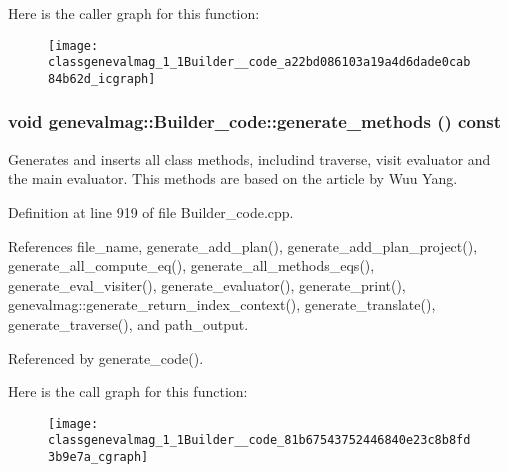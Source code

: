 Here is the caller graph for this function:\nopagebreak
\begin{figure}[H]
\begin{center}
\leavevmode
\texttt{[image: classgenevalmag\_1\_1Builder\_\_code\_a22bd086103a19a4d6dade0cab84b62d\_icgraph]}
\end{center}
\end{figure}
\hypertarget{classgenevalmag_1_1Builder__code_81b67543752446840e23c8b8fd3b9e7a}{
\subsubsection[{generate\_\-methods}]{\setlength{\rightskip}{0pt plus 5cm}void genevalmag::Builder\_\-code::generate\_\-methods () const}}
\label{classgenevalmag_1_1Builder__code_81b67543752446840e23c8b8fd3b9e7a}


Generates and inserts all class methods, includind traverse, visit evaluator and the main evaluator. This methods are based on the article by Wuu Yang. 

Definition at line 919 of file Builder\_\-code.cpp.

References file\_\-name, generate\_\-add\_\-plan(), generate\_\-add\_\-plan\_\-project(), generate\_\-all\_\-compute\_\-eq(), generate\_\-all\_\-methods\_\-eqs(), generate\_\-eval\_\-visiter(), generate\_\-evaluator(), generate\_\-print(), genevalmag::generate\_\-return\_\-index\_\-context(), generate\_\-translate(), generate\_\-traverse(), and path\_\-output.

Referenced by generate\_\-code().

Here is the call graph for this function:\nopagebreak
\begin{figure}[H]
\begin{center}
\leavevmode
\texttt{[image: classgenevalmag\_1\_1Builder\_\_code\_81b67543752446840e23c8b8fd3b9e7a\_cgraph]}
\end{center}
\end{figure}


